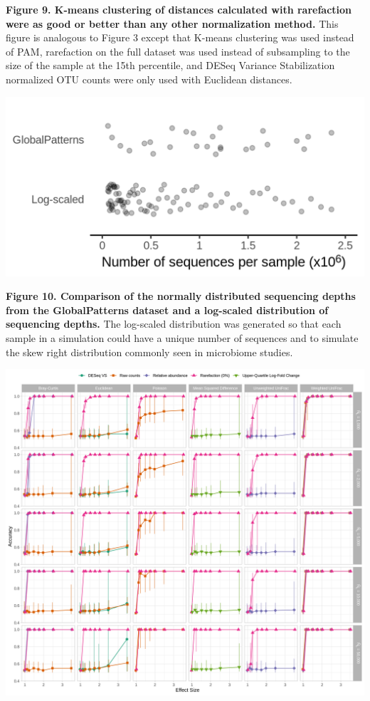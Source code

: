 \documentclass[
]{article}
\begin{document}
\textbf{Figure 9. K-means clustering of distances calculated with
rarefaction were as good or better than any other normalization method.}
This figure is analogous to Figure 3 except that K-means clustering was
used instead of PAM, rarefaction on the full dataset was used instead of
subsampling to the size of the sample at the 15th percentile, and DESeq
Variance Stabilization normalized OTU counts were only used with
Euclidean distances.

\newpage

\includegraphics{figure_10.png}

\textbf{Figure 10. Comparison of the normally distributed sequencing
depths from the GlobalPatterns dataset and a log-scaled distribution of
sequencing depths.} The log-scaled distribution was generated so that
each sample in a simulation could have a unique number of sequences and
to simulate the skew right distribution commonly seen in microbiome
studies.

\newpage

\includegraphics{figure_11.png}
\end{document}

